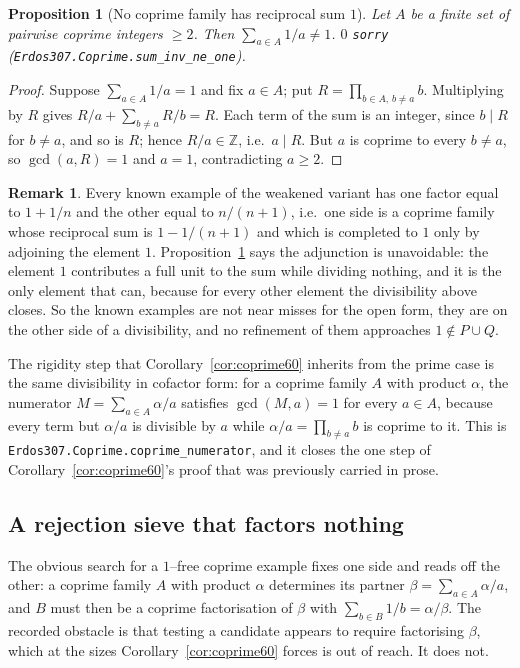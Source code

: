 \documentclass[11pt]{article}
\newtheorem{proposition}[theorem]{Proposition}
\theoremstyle{definition}
\newtheorem{remark}[theorem]{Remark}
\begin{document}
\begin{proposition}[No coprime family has reciprocal sum $1$]\label{prop:coprimeone}
Let $A$ be a finite set of pairwise coprime integers $\ge2$. Then $\sum_{a\in A}1/a\ne1$.
$0$ \texttt{sorry} \textup{(\texttt{Erdos307.Coprime.sum\_inv\_ne\_one})}.
\end{proposition}
\begin{proof}
Suppose $\sum_{a\in A}1/a=1$ and fix $a\in A$; put $R=\prod_{b\in A,\,b\ne a}b$. Multiplying by $R$
gives $R/a+\sum_{b\ne a}R/b=R$. Each term of the sum is an integer, since $b\mid R$ for $b\ne a$, and
so is $R$; hence $R/a\in\mathbb{Z}$, i.e.\ $a\mid R$. But $a$ is coprime to every $b\ne a$, so
$\gcd(a,R)=1$ and $a=1$, contradicting $a\ge2$.
\end{proof}

\begin{remark}\label{rem:coprimeedge}
Every known example of the weakened variant has one factor equal to $1+1/n$ and the other equal to
$n/(n+1)$, i.e.\ one side is a coprime family whose reciprocal sum is $1-1/(n+1)$ and which is
completed to $1$ only by adjoining the element $1$. Proposition~\ref{prop:coprimeone} says the
adjunction is unavoidable: the element $1$ contributes a full unit to the sum while dividing nothing,
and it is the only element that can, because for every other element the divisibility above closes.
So the known examples are not near misses for the open form, they are on the other side of a
divisibility, and no refinement of them approaches $1\notin P\cup Q$.

The rigidity step that Corollary~\ref{cor:coprime60} inherits from the prime case is the same
divisibility in cofactor form: for a coprime family $A$ with product $\alpha$, the numerator
$M=\sum_{a\in A}\alpha/a$ satisfies $\gcd(M,a)=1$ for every $a\in A$, because every term but
$\alpha/a$ is divisible by $a$ while $\alpha/a=\prod_{b\ne a}b$ is coprime to it. This is
\texttt{Erdos307.Coprime.coprime\_numerator}, and it closes the one step of
Corollary~\ref{cor:coprime60}'s proof that was previously carried in prose.
\end{remark}

\subsection{A rejection sieve that factors nothing}\label{ssec:coprimesieve}

The obvious search for a $1$--free coprime example fixes one side and reads off the other: a coprime
family $A$ with product $\alpha$ determines its partner $\beta=\sum_{a\in A}\alpha/a$, and $B$ must
then be a coprime factorisation of $\beta$ with $\sum_{b\in B}1/b=\alpha/\beta$. The recorded
obstacle is that testing a candidate appears to require factorising $\beta$, which at the sizes
Corollary~\ref{cor:coprime60} forces is out of reach. It does not.
\end{document}
